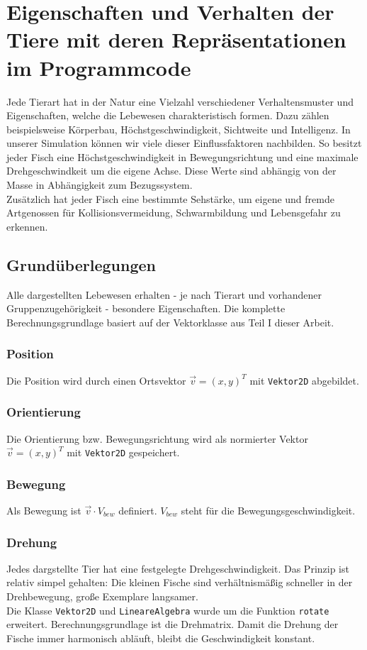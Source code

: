 \documentclass[11pt]{article}
\begin{document}
\section{Eigenschaften und Verhalten der Tiere mit deren Repräsentationen im Programmcode}
Jede Tierart hat in der Natur eine Vielzahl verschiedener Verhaltensmuster und Eigenschaften, welche die Lebewesen charakteristisch formen. Dazu zählen beispielsweise Körperbau, Höchstgeschwindigkeit, Sichtweite und Intelligenz. In unserer Simulation können wir viele dieser Einflussfaktoren nachbilden.
So besitzt jeder Fisch eine Höchstgeschwindigkeit in Bewegungsrichtung und eine maximale Drehgeschwindkeit um die eigene Achse. Diese Werte sind abhängig von der Masse in Abhängigkeit zum Bezugssystem.\\
Zusätzlich hat jeder Fisch eine bestimmte Sehstärke, um eigene und fremde Artgenossen für Kollisionsvermeidung, Schwarmbildung und Lebensgefahr zu erkennen.
\newpage
\subsection{Grundüberlegungen}
Alle dargestellten Lebewesen erhalten - je nach Tierart und vorhandener Gruppenzugehörigkeit - besondere Eigenschaften. Die komplette Berechnungsgrundlage basiert auf der Vektorklasse aus Teil I dieser Arbeit.
\subsubsection{Position}
Die Position wird durch einen Ortsvektor \( \vec{v}=(x,y)^T \) mit \lstinline{Vektor2D} abgebildet.
\subsubsection{Orientierung}
Die Orientierung bzw. Bewegungsrichtung wird als normierter Vektor \( \vec{v}=(x,y)^T \) mit \lstinline{Vektor2D} gespeichert.
\subsubsection{Bewegung}
Als Bewegung ist \( \vec{v} \cdot V_{bew} \) definiert. \( V_{bew} \) steht für die Bewegungsgeschwindigkeit.
\subsubsection{Drehung}
Jedes dargstellte Tier hat eine festgelegte Drehgeschwindigkeit. Das Prinzip ist relativ simpel gehalten: Die kleinen Fische sind verhältnismäßig schneller in der Drehbewegung, große Exemplare langsamer.\\
Die Klasse \lstinline{Vektor2D} und \lstinline{LineareAlgebra} wurde um die Funktion \lstinline{rotate} erweitert. Berechnungsgrundlage ist die Drehmatrix. Damit die Drehung der Fische immer harmonisch abläuft, bleibt die Geschwindigkeit konstant.
\end{document}

